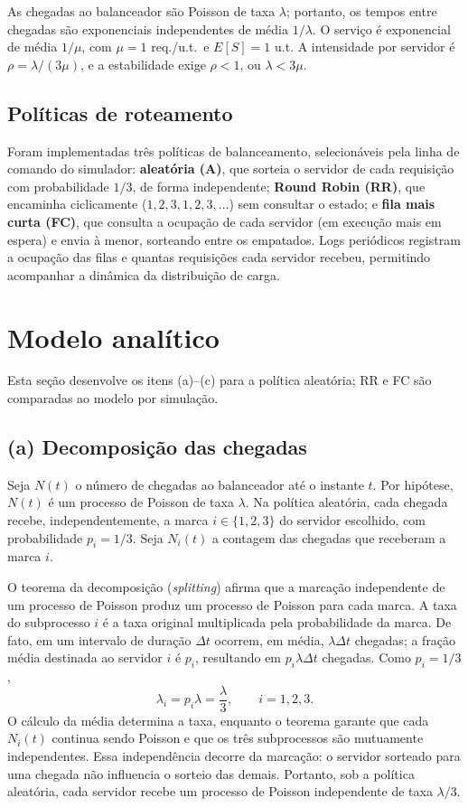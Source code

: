 \documentclass[conference,a4paper]{IEEEtran}
\begin{document}
As chegadas ao balanceador são Poisson de taxa $\lambda$; portanto, os
tempos entre chegadas são exponenciais independentes de média $1/\lambda$.
O serviço é exponencial de média $1/\mu$, com $\mu=1$ req./u.t.\ e
$E[S]=1$ u.t. A intensidade por servidor é
$\rho=\lambda/(3\mu)$, e a estabilidade exige $\rho<1$, ou
$\lambda<3\mu$.

\subsection{Políticas de roteamento}

Foram implementadas três políticas de balanceamento, selecionáveis pela
linha de comando do simulador: \textbf{aleatória (A)}, que sorteia o
servidor de cada requisição com probabilidade $1/3$, de forma
independente; \textbf{Round Robin (RR)}, que encaminha ciclicamente
($1,2,3,1,2,3,\dots$) sem consultar o estado; e \textbf{fila mais curta
(FC)}, que consulta a ocupação de cada servidor (em execução mais em
espera) e envia à menor, sorteando entre os empatados. Logs periódicos
registram a ocupação das filas e quantas requisições cada servidor recebeu,
permitindo acompanhar a dinâmica da distribuição de carga.

\section{Modelo analítico}

Esta seção desenvolve os itens (a)--(c) para a política aleatória; RR e FC
são comparadas ao modelo por simulação.

\subsection{(a) Decomposição das chegadas}

Seja $N(t)$ o número de chegadas ao balanceador até o instante $t$. Por
hipótese, $N(t)$ é um processo de Poisson de taxa $\lambda$. Na política
aleatória, cada chegada recebe, independentemente, a marca
$i\in\{1,2,3\}$ do servidor escolhido, com probabilidade $p_i=1/3$. Seja
$N_i(t)$ a contagem das chegadas que receberam a marca $i$.

O teorema da decomposição (\emph{splitting}) afirma que a marcação
independente de um processo de Poisson produz um processo de Poisson para
cada marca. A taxa do subprocesso $i$ é a taxa original multiplicada pela
probabilidade da marca. De fato, em um intervalo de duração $\Delta t$
ocorrem, em média, $\lambda\Delta t$ chegadas; a fração média destinada ao
servidor $i$ é $p_i$, resultando em $p_i\lambda\Delta t$ chegadas. Como
$p_i=1/3$,
\begin{equation}
 \lambda_i=p_i\lambda=\frac{\lambda}{3},\qquad i=1,2,3.
 \label{eq:splitting}
\end{equation}
O cálculo da média determina a taxa, enquanto o teorema garante que cada
$N_i(t)$ continua sendo Poisson e que os três subprocessos são mutuamente
independentes. Essa independência decorre da marcação: o servidor sorteado
para uma chegada não influencia o sorteio das demais. Portanto, sob a
política aleatória, cada servidor recebe um processo de Poisson independente
de taxa $\lambda/3$.
\end{document}
